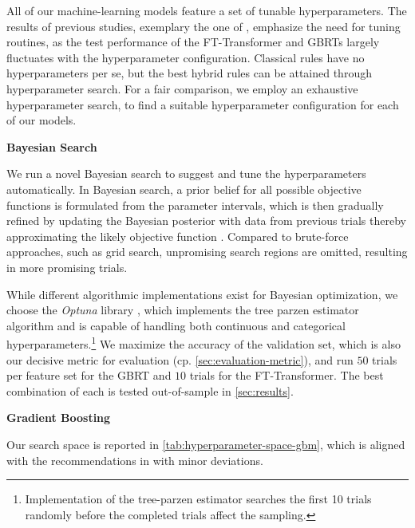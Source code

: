 All of our machine-learning models feature a set of tunable hyperparameters. The results of previous studies, exemplary the one of \textcite[\checkmark][511]{grinsztajnWhyTreebasedModels2022}, emphasize the need for tuning routines, as the test performance of the FT-Transformer and \glspl{GBRT} largely fluctuates with the hyperparameter configuration. Classical rules have no hyperparameters per se, but the best hybrid rules can be attained through hyperparameter search.
For a fair comparison, we employ an exhaustive hyperparameter search, to find a suitable hyperparameter configuration for each of our models.

\textbf{Bayesian Search}

We run a novel Bayesian search to suggest and tune the hyperparameters automatically. In Bayesian search, a prior belief for all possible objective functions is formulated from the parameter intervals, which is then gradually refined by updating the Bayesian posterior with data from previous trials thereby approximating the likely objective function \autocite[\checkmark][149]{shahriariTakingHumanOut2016}. Compared to brute-force approaches, such as grid search, unpromising search regions are omitted, resulting in more promising trials.

While different algorithmic implementations exist for Bayesian optimization, we choose the \emph{Optuna} library \autocite[\checkmark][2623--2631]{akibaOptunaNextgenerationHyperparameter2019}, which implements the tree parzen estimator algorithm and is capable of handling both continuous and categorical hyperparameters.\footnote{Implementation of the tree-parzen estimator searches the first 10 trials randomly before the completed trials affect the sampling.} We maximize the accuracy of the validation set, which is also our decisive metric for evaluation (cp. \cref{sec:evaluation-metric}), and run $\num{50}$ trials per feature set for the \gls{GBRT} and $\num{10}$ trials for the FT-Transformer. The best combination of each is tested out-of-sample in \cref{sec:results}.

\textbf{Gradient Boosting}

Our search space is reported in \cref{tab:hyperparameter-space-gbm}, which is aligned with the recommendations in \textcite[][6659]{prokhorenkovaCatBoostUnbiasedBoosting2018} with minor deviations.


